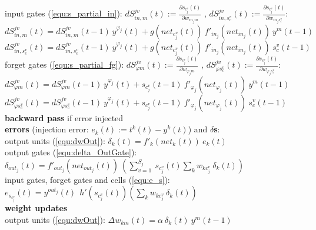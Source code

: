 {{\begin{tabbing}
  \>  \> input gates (\ref{equ:s_partial_in}): 
$dS^{jv}_{in,m}(t) := \frac{\partial s_{c_j^v}(t)}{\partial w_{in_j m}}$ ,
$dS^{jv}_{in,s_c^v}(t) := \frac{\partial s_{c_j^v}(t)}{\partial w_{in_j s_c^v}}$:\\
  \>  \> $dS^{jv}_{in,m}(t) = dS^{jv}_{in,m}(t\!-\!1) \ y^{\varphi_j}(t) + g(net_{c_j^v}(t)) \ f'_{in_j}(net_{in_j}(t)) \ y^m(t\!-\!1)$\\
  \>  \> $dS^{jv}_{in,s_c^v}(t) = dS^{jv}_{in,s_c^v}(t\!-\!1) \ y^{\varphi_j}(t) + g(net_{c_j^v}(t)) \ f'_{in_j}(net_{in_j}(t)) \ s_c^v(t\!-\!1)$\\
  \>  \> forget gates (\ref{equ:s_partial_fg}): 
$dS^{jv}_{\varphi m}(t) := \frac{\partial s_{c_j^v}(t)}{\partial w_{\varphi_j m}}$ ,
$dS^{jv}_{\varphi s_c^v}(t) := \frac{\partial s_{c_j^v}(t)}{\partial w_{\varphi_j s_c^v}}$:\\
  \>  \> $dS^{jv}_{\varphi m}(t) = dS^{jv}_{\varphi m}(t\!-\!1) \ y^{\varphi_j}(t) + s_{c_j^v}(t\!-\!1) \ f'_{\varphi_j}(net_{\varphi_j}(t)) \ y^m(t\!-\!1)$\\
  \>  \> $dS^{jv}_{\varphi s_c^v}(t) = dS^{jv}_{\varphi s_c^v}(t\!-\!1) \ y^{\varphi_j}(t) + s_{c_j^v}(t\!-\!1) \ f'_{\varphi_j}(net_{\varphi_j}(t)) \ s_c^v(t\!-\!1)$\\
{\bf backward pass} if error injected \\ 
  \> {\bf errors} (injection error: $e_k(t) := t^k(t)-y^k(t)$) and {\bf $\delta$s}:\\
  \>  \> output units (\ref{equ:dwOut}): $\delta_k(t) = f'_k(net_k(t)) \ e_k(t)$\\
  \>  \> output gates (\ref{equ:delta_OutGate}):
$\delta_{out_j}(t) = f'_{out_j}(net_{out_j}(t)) \ \left( \sum_{v =1}^{S_j} \ s_{c_j^v}(t) \sum_{k} w_{kc_j^v} \ \delta_k(t) \right)$\\
  \>  \> input gates, forget gates and  cells (\ref{equ:e_s}):\\
  \>  \>$e_{s_{c_j^v}}(t) = y^{out_j}(t) \ \ h'(s_{c_j^v}(t)) 
\left( \sum_{k} w_{kc_j^v} \ \delta_k(t) \right)$\\
  \> {\bf weight updates}\\
  \>  \> output units (\ref{equ:dwOut}): 
$\Delta w_{km}(t) = \alpha \ \delta_k(t) \ y^m(t\!-\!1)$\\

\end{tabbing}}}
